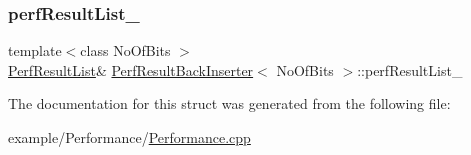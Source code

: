 \subsubsection{\texorpdfstring{perf\+Result\+List\+\_\+}{perfResultList\_}}
{\footnotesize\ttfamily template$<$class No\+Of\+Bits $>$ \\
\mbox{\hyperlink{_performance_8cpp_a6182ff5fcd4814adbff677bd44fd6ae4}{Perf\+Result\+List}}\& \mbox{\hyperlink{struct_perf_result_back_inserter}{Perf\+Result\+Back\+Inserter}}$<$ No\+Of\+Bits $>$\+::perf\+Result\+List\+\_\+\hspace{0.3cm}{\ttfamily [private]}}



The documentation for this struct was generated from the following file\+:\begin{DoxyCompactItemize}
\item 
example/\+Performance/\mbox{\hyperlink{_performance_8cpp}{Performance.\+cpp}}\end{DoxyCompactItemize}
